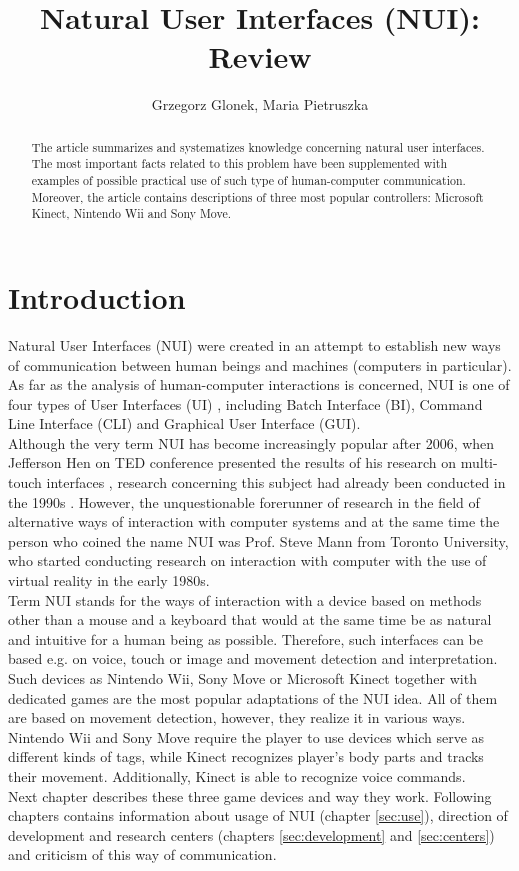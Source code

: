 \documentclass{jacsart}
\title{Natural User Interfaces (NUI): Review}
\author{Grzegorz Glonek\inst{1}, Maria Pietruszka\inst{2}}
\affiliation{%
  \inst{1}Łódź University of Technology\\
  Institute of Information Technology\\
  Wólczańska 215, 90-924 Łódź, Poland\\
  grzegorz@glonek.net.pl
  \andinst
  \inst{2}Łódź University of Technology\\
    Institute of Information Technology\\
    Wólczańska 215, 90-924 Łódź, Poland\\
    maria.pietruszka@p.lodz.pl}
\begin{document}
\maketitle

\begin{abstract}
The article summarizes and systematizes knowledge concerning natural user interfaces. The most important facts related to this problem have been supplemented with examples of possible practical use of such type of human-computer communication. Moreover, the article contains descriptions of three most popular controllers: Microsoft Kinect, Nintendo Wii and Sony Move. 
\end{abstract}

\section{Introduction}
\indent Natural User Interfaces (NUI) were created in an attempt to establish new ways of communication between human beings and machines (computers in particular). As far as the analysis of human-computer interactions is concerned, NUI is one of four types of User Interfaces (UI) \cite{Liu2010b}, including Batch Interface (BI), Command Line Interface (CLI) and Graphical User Interface (GUI).\\
\indent Although the very term NUI has become increasingly popular after 2006, when Jefferson Hen on TED conference presented the results of his research on multi-touch interfaces \cite{Han2006}, research concerning this subject had already been conducted in the 1990s \cite{Rauterberg1997, Rauterberg1996, Rauterberg1996a}. However, the unquestionable forerunner of research in the field of alternative ways of interaction with computer systems and at the same time the person who coined the name NUI was Prof. Steve Mann from Toronto University, who started conducting research on interaction with computer with the use of virtual reality in the early 1980s.\\
\indent Term NUI stands for the ways of interaction with a device based on methods other than a mouse and a keyboard that would at the same time be as natural and intuitive for a human being as possible. Therefore, such interfaces can be based e.g. on voice, touch or image and movement detection and interpretation. Such devices as Nintendo Wii, Sony Move or Microsoft Kinect together with dedicated games are the most popular adaptations of the NUI idea. All of them are based on movement detection, however, they realize it in various ways. Nintendo Wii and Sony Move require the player to use devices which serve as different kinds of tags, while Kinect recognizes player’s body parts and tracks their movement. Additionally, Kinect is able to recognize voice commands.\\
\indent Next chapter describes these three game devices and way they work.  Following chapters contains information about usage of NUI (chapter \ref{sec:use}), direction of development and research centers (chapters \ref{sec:development} and \ref{sec:centers}) and criticism of this way of communication.
\end{document}
